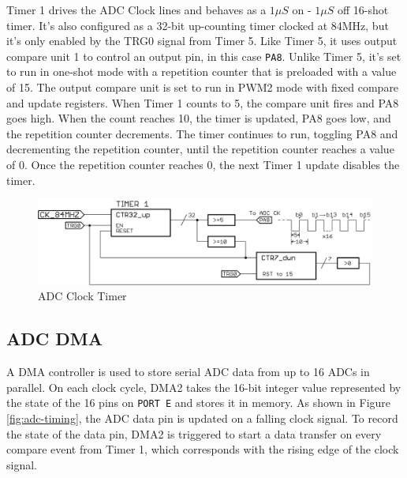 Timer 1 drives the ADC Clock lines and behaves as a $1\mu S$ on - $1\mu S$ off 16-shot timer.
It's also configured as a 32-bit up-counting timer clocked at 84MHz, but it's only enabled by the TRG0 signal from Timer 5.
Like Timer 5, it uses output compare unit 1 to control an output pin, in this case \texttt{PA8}.
Unlike Timer 5, it's set to run in one-shot mode with a repetition counter that is preloaded with a value of 15.
The output compare unit is set to run in PWM2 mode with fixed compare and update registers.
When Timer 1 counts to 5, the compare unit fires and PA8 goes high.
When the count reaches 10, the timer is updated, PA8 goes low, and the repetition counter decrements.
The timer continues to run, toggling PA8 and decrementing the repetition counter, until the repetition counter reaches a value of 0.
Once the repetition counter reaches 0, the next Timer 1 update disables the timer.



\begin{figure}[h!]
  \begin{center}
      \includegraphics[width=1\textwidth]{../tim1.png}
      \caption{ADC Clock Timer}
  \end{center}
\end{figure}


\subsection{ADC DMA}

A DMA controller is used to store serial ADC data from up to 16 ADCs in parallel.
On each clock cycle, DMA2 takes the 16-bit integer value represented by the state of the 16 pins on \texttt{PORT E} and stores it in memory. 
As shown in Figure \ref{fig:adc-timing}, the ADC data pin is updated on a falling clock signal.
To record the state of the data pin, DMA2 is triggered to start a data transfer on every compare event from Timer 1, which corresponds with the rising edge of the clock signal.

